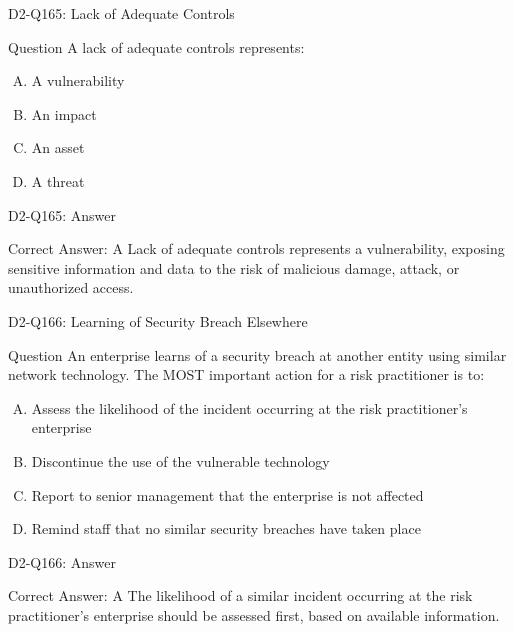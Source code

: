 \documentclass{beamer}
\begin{document}
	\begin{frame}{D2-Q165: Lack of Adequate Controls}
		\begin{block}{Question}
			A lack of adequate controls represents:
		\end{block}
		\begin{enumerate}[(A)]
			\item A vulnerability
			\item An impact
			\item An asset
			\item A threat
		\end{enumerate}
	\end{frame}
	\begin{frame}{D2-Q165: Answer}
		\begin{block}{Correct Answer: A}
			Lack of adequate controls represents a vulnerability, exposing sensitive information and data to the risk of malicious damage, attack, or unauthorized access.
		\end{block}
	\end{frame}
	
	\begin{frame}{D2-Q166: Learning of Security Breach Elsewhere}
		\begin{block}{Question}
			An enterprise learns of a security breach at another entity using similar network technology. The MOST important action for a risk practitioner is to:
		\end{block}
		\begin{enumerate}[(A)]
			\item Assess the likelihood of the incident occurring at the risk practitioner's enterprise
			\item Discontinue the use of the vulnerable technology
			\item Report to senior management that the enterprise is not affected
			\item Remind staff that no similar security breaches have taken place
		\end{enumerate}
	\end{frame}
	\begin{frame}{D2-Q166: Answer}
		\begin{block}{Correct Answer: A}
			The likelihood of a similar incident occurring at the risk practitioner's enterprise should be assessed first, based on available information.
		\end{block}
	\end{frame}
	
\end{document}
